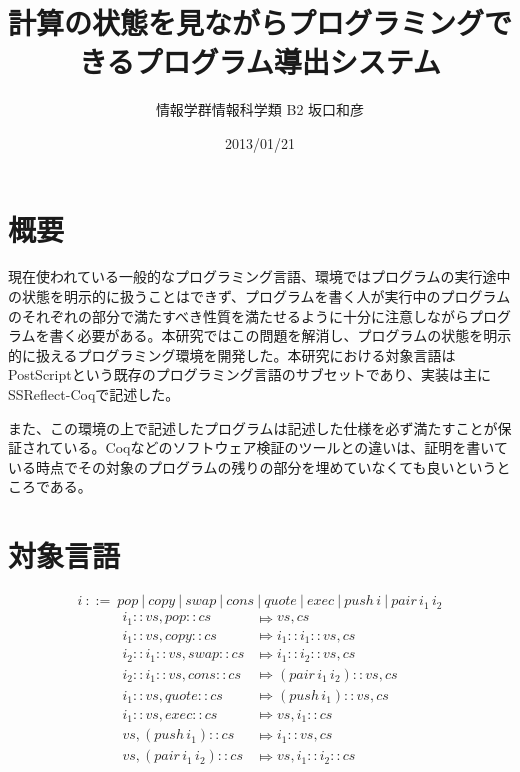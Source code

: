 \documentclass[a4paper, 10.5pt, twocolumn]{ujarticle}
\title{計算の状態を見ながらプログラミングできるプログラム導出システム}
\author{情報学群情報科学類 B2 坂口和彦}
\date{2013/01/21}
\begin{document}
\maketitle

\section*{概要}

現在使われている一般的なプログラミング言語、環境ではプログラムの実行途中の状態を明示的に扱うことはできず、プログラムを書く人が実行中のプログラムのそれぞれの部分で満たすべき性質を満たせるように十分に注意しながらプログラムを書く必要がある。本研究ではこの問題を解消し、プログラムの状態を明示的に扱えるプログラミング環境を開発した。本研究における対象言語はPostScriptという既存のプログラミング言語のサブセットであり、実装は主にSSReflect-Coqで記述した。

また、この環境の上で記述したプログラムは記述した仕様を必ず満たすことが保証されている。Coqなどのソフトウェア検証のツールとの違いは、証明を書いている時点でその対象のプログラムの残りの部分を埋めていなくても良いというところである。

\section*{対象言語}

\vspace{-1cm}
\[
 i \: ::= \: pop
   \:  |  \: copy
   \:  |  \: swap
   \:  |  \: cons
   \:  |  \: quote
   \:  |  \: exec
   \:  |  \: push \, i
   \:  |  \: pair \, i_1 \, i_2
\]
\vspace{-1cm}
\begin{align*}
 i_1 :: vs , \mathit{pop} :: cs           & \Mapsto vs , cs \\[-2mm]
 i_1 :: vs , \mathit{copy} :: cs          & \Mapsto i_1 :: i_1 :: vs , cs \\[-2mm]
 i_2 :: i_1 :: vs , \mathit{swap} :: cs   & \Mapsto i_1 :: i_2 :: vs, cs \\[-2mm]
 i_2 :: i_1 :: vs , \mathit{cons} :: cs   & \Mapsto (\mathit{pair} \, i_1 \, i_2) :: vs , cs \\[-2mm]
 i_1 :: vs , \mathit{quote} :: cs         & \Mapsto (\mathit{push} \, i_1) :: vs , cs \\[-2mm]
 i_1 :: vs , \mathit{exec} :: cs          & \Mapsto vs , i_1 :: cs \\[-2mm]
 vs , (\mathit{push} \, i_1) :: cs        & \Mapsto i_1 :: vs , cs \\[-2mm]
 vs , (\mathit{pair} \, i_1 \, i_2) :: cs & \Mapsto vs , i_1 :: i_2 :: cs
\end{align*}
\end{document}
